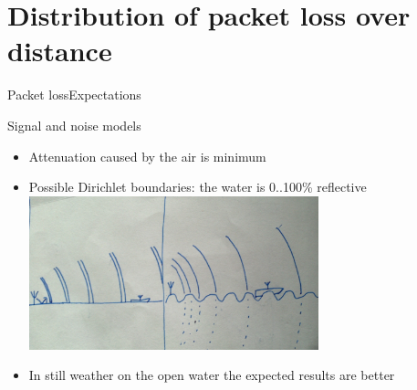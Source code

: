 \section{Distribution of packet loss over distance}
\begin{frame}{Packet loss}{Expectations}
    \begin{block}{Signal and noise models}
    \begin{itemize}
		\item Attenuation caused by the air is minimum
		\item Possible Dirichlet boundaries: the water is 0..100\% reflective
		\includegraphics[width=8.4cm]{img/propagation}
		\item In still weather on the open water the expected results are better
    \end{itemize}
    \end{block}
\end{frame}

